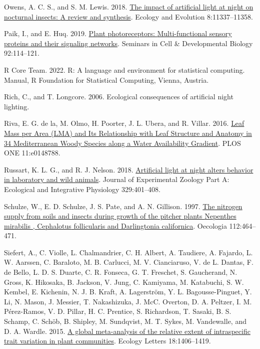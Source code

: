 \documentclass[
  12pt,
  letterpaper,
  DIV=11,
  numbers=noendperiod]{scrartcl}
\newlength{\cslhangindent}
\newlength{\cslentryspacingunit} %
\newenvironment{CSLReferences}[2] %
 {%
  \setlength{\parindent}{0pt}
  \ifodd #1
  \let\oldpar\par
  \def\par{\hangindent=\cslhangindent\oldpar}
  \fi
  \setlength{\parskip}{#2\cslentryspacingunit}
 }%
 {}
\begin{document}
\begin{CSLReferences}{1}{0}
\leavevmode{}%
Owens, A. C. S., and S. M. Lewis. 2018.
\href{https://doi.org/10.1002/ece3.4557}{The impact of artificial light
at night on nocturnal insects: {A} review and synthesis}. Ecology and
Evolution 8:11337--11358.

\leavevmode{}%
Paik, I., and E. Huq. 2019.
\href{https://doi.org/10.1016/j.semcdb.2019.03.007}{Plant
photoreceptors: {Multi-functional} sensory proteins and their signaling
networks}. Seminars in Cell \& Developmental Biology 92:114--121.

\leavevmode{}%
R Core Team. 2022. R: {A} language and environment for statistical
computing. Manual, {R Foundation for Statistical Computing}, {Vienna,
Austria}.

\leavevmode{}%
Rich, C., and T. Longcore. 2006. Ecological consequences of artificial
night lighting.

\leavevmode{}%
Riva, E. G. de la, M. Olmo, H. Poorter, J. L. Ubera, and R. Villar.
2016. \href{https://doi.org/10.1371/journal.pone.0148788}{Leaf {Mass}
per {Area} ({LMA}) and {Its Relationship} with {Leaf Structure} and
{Anatomy} in 34 {Mediterranean Woody Species} along a {Water
Availability Gradient}}. PLOS ONE 11:e0148788.

\leavevmode{}%
Russart, K. L. G., and R. J. Nelson. 2018.
\href{https://doi.org/10.1002/jez.2173}{Artificial light at night alters
behavior in laboratory and wild animals}. Journal of Experimental
Zoology Part A: Ecological and Integrative Physiology 329:401--408.

\leavevmode{}%
Schulze, W., E. D. Schulze, J. S. Pate, and A. N. Gillison. 1997.
\href{https://doi.org/10.1007/s004420050333}{The nitrogen supply from
soils and insects during growth of the pitcher plants {Nepenthes}
mirabilis , {Cephalotus} follicularis and {Darlingtonia} californica}.
Oecologia 112:464--471.

\leavevmode{}%
Siefert, A., C. Violle, L. Chalmandrier, C. H. Albert, A. Taudiere, A.
Fajardo, L. W. Aarssen, C. Baraloto, M. B. Carlucci, M. V. Cianciaruso,
V. de L. Dantas, F. de Bello, L. D. S. Duarte, C. R. Fonseca, G. T.
Freschet, S. Gaucherand, N. Gross, K. Hikosaka, B. Jackson, V. Jung, C.
Kamiyama, M. Katabuchi, S. W. Kembel, E. Kichenin, N. J. B. Kraft, A.
Lagerström, Y. L. Bagousse-Pinguet, Y. Li, N. Mason, J. Messier, T.
Nakashizuka, J. McC. Overton, D. A. Peltzer, I. M. Pérez-Ramos, V. D.
Pillar, H. C. Prentice, S. Richardson, T. Sasaki, B. S. Schamp, C.
Schöb, B. Shipley, M. Sundqvist, M. T. Sykes, M. Vandewalle, and D. A.
Wardle. 2015. \href{https://doi.org/10.1111/ele.12508}{A global
meta-analysis of the relative extent of intraspecific trait variation in
plant communities}. Ecology Letters 18:1406--1419.


\end{CSLReferences}
\end{document}
